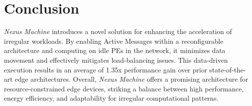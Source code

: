 \vspace{-.1cm}
\section{Conclusion}
\begin{comment}
\textit{Nexus Machine} introduces a novel solution for enhancing the acceleration of irregular workloads by enabling Active Messages within a reconfigurable architecture.
By incorporating Active Messages, \textit{Nexus Machine} brings computations closer to the data, thus minimizing data movement.
Further, computing on idle PEs in the network effectively addresses and mitigates load-balancing issues, distinguishing it from traditional statically-scheduled reconfigurable architectures. This data-driven execution results in an average of 1.35x performance gain over prior state-of-the-art edge architectures.
Overall, \textit{Nexus Machine} offers a promising architecture for resource-constrained edge devices, striking a balance between high performance, energy efficiency, and adaptability for irregular computational patterns.
\end{comment}
\textit{Nexus Machine} introduces a novel solution for enhancing the acceleration of irregular workloads. 
By enabling Active Messages within a reconfigurable architecture and computing on idle PEs in the network, it minimizes data movement and effectively mitigates load-balancing issues. 
This data-driven execution results in an average of 1.35x performance gain over prior state-of-the-art edge architectures.
Overall, \textit{Nexus Machine} offers a promising architecture for resource-constrained edge devices, striking a balance between high performance, energy efficiency, and adaptability for irregular computational patterns.